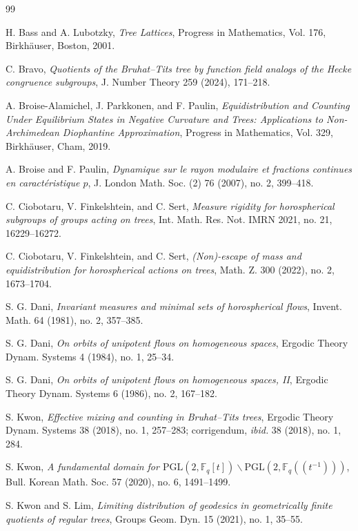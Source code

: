 \documentclass[11pt]{amsart}
\theoremstyle{definition}
\theoremstyle{plain}
\newcommand{\Fq}{\mathbb F_q}
\begin{document}
\begin{thebibliography}{99}

H. Bass and A. Lubotzky,
\emph{Tree Lattices},
Progress in Mathematics, Vol. 176, Birkh\"{a}user, Boston, 2001.

C. Bravo,
\emph{Quotients of the Bruhat--Tits tree by function field analogs of the Hecke congruence subgroups},
J. Number Theory 259 (2024), 171--218.

A. Broise-Alamichel, J. Parkkonen, and F. Paulin,
\emph{Equidistribution and Counting Under Equilibrium States in Negative Curvature and Trees: Applications to Non-Archimedean Diophantine Approximation},
Progress in Mathematics, Vol. 329, Birkh\"{a}user, Cham, 2019.

A. Broise and F. Paulin,
\emph{Dynamique sur le rayon modulaire et fractions continues en
caract\'eristique \(p\)},
J. London Math. Soc. (2) 76 (2007), no. 2, 399--418.

C. Ciobotaru, V. Finkelshtein, and C. Sert,
\emph{Measure rigidity for horospherical subgroups of groups acting on trees},
Int. Math. Res. Not. IMRN 2021, no. 21, 16229--16272.

C. Ciobotaru, V. Finkelshtein, and C. Sert,
\emph{(Non)-escape of mass and equidistribution for horospherical actions on trees},
Math. Z. 300 (2022), no. 2, 1673--1704.

S. G. Dani,
\emph{Invariant measures and minimal sets of horospherical flows},
Invent. Math. 64 (1981), no. 2, 357--385.

S. G. Dani,
\emph{On orbits of unipotent flows on homogeneous spaces},
Ergodic Theory Dynam. Systems 4 (1984), no. 1, 25--34.

S. G. Dani,
\emph{On orbits of unipotent flows on homogeneous spaces, II},
Ergodic Theory Dynam. Systems 6 (1986), no. 2, 167--182.

S. Kwon,
\emph{Effective mixing and counting in Bruhat--Tits trees},
Ergodic Theory Dynam. Systems 38 (2018), no. 1, 257--283;
corrigendum, \emph{ibid.} 38 (2018), no. 1, 284.

S. Kwon,
\emph{A fundamental domain for \(\mathrm{PGL}(2,\Fq[t])\backslash
\mathrm{PGL}(2,\Fq(\!(t^{-1})\!))\)},
Bull. Korean Math. Soc. 57 (2020), no. 6, 1491--1499.


S. Kwon and S. Lim,
\emph{Limiting distribution of geodesics in geometrically finite quotients of regular trees},
Groups Geom. Dyn. 15 (2021), no. 1, 35--55.


\end{thebibliography}
\end{document}
